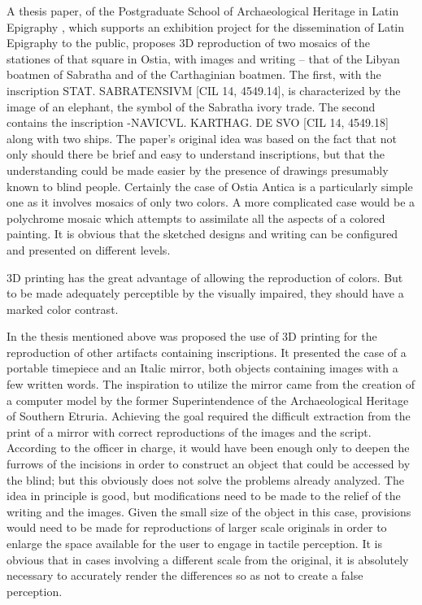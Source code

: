 \documentclass[amsthm,ebook]{saparticle}
\begin{document}
A thesis paper, of the Postgraduate School of Archaeological Heritage in Latin Epigraphy \citep{Licordari2015}, which
supports an exhibition project for the dissemination of Latin Epigraphy to the public, proposes 3D reproduction of two
mosaics of the stationes of that square in Ostia, with images and writing – that of the Libyan boatmen of Sabratha and
of the Carthaginian boatmen. The first, with the inscription STAT. SABRATENSIVM [CIL 14, 4549.14], is characterized by
the image of an elephant, the symbol of the Sabratha ivory trade. The second contains the inscription -NAVICVL.
KARTHAG. DE SVO [CIL 14, 4549.18] along with two ships. The paper’s original idea was based on the fact that not only
should there be brief and easy to understand inscriptions, but that the understanding could be made easier by the
presence of drawings presumably known to blind people. Certainly the case of Ostia Antica is a particularly simple one
as it involves mosaics of only two colors. A more complicated case would be a polychrome mosaic which attempts to
assimilate all the aspects of a colored painting. It is obvious that the sketched designs and writing can be configured
and presented on different levels.

3D printing has the great advantage of allowing the reproduction of colors. But to be made adequately perceptible by the
visually impaired, they should have a marked color contrast.

In the thesis mentioned above was proposed the use of 3D printing for the reproduction of other artifacts containing
inscriptions. It presented the case of a portable timepiece and an Italic mirror, both objects containing images with a
few written words. The inspiration to utilize the mirror came from the creation of a computer model by the former
Superintendence of the Archaeological Heritage of Southern Etruria. Achieving the goal required the difficult
extraction from the print of a mirror with correct reproductions of the images and the script. According to the officer
in charge, it would have been enough only to deepen the furrows of the incisions in order to construct an object that
could be accessed by the blind; but this obviously does not solve the problems already analyzed. The idea in principle
is good, but modifications need to be made to the relief of the writing and the images. Given the small size of the
object in this case, provisions would need to be made for reproductions of larger scale originals in order to enlarge
the space available for the user to engage in tactile perception. It is obvious that in cases involving a different
scale from the original, it is absolutely necessary to accurately render the differences so as not to create a false
perception.
\end{document}
